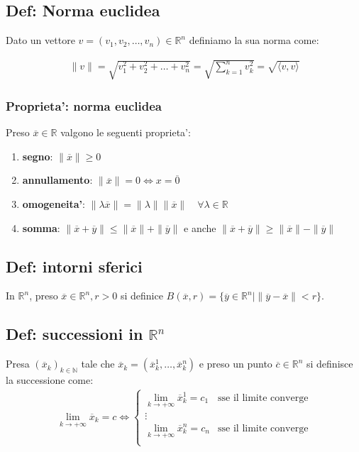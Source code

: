 \documentclass{article}
\begin{document}
\subsection{Def: Norma euclidea}

Dato un vettore $v = (v_1, v_2, \ldots, v_n) \in \mathbb{R}^n$ definiamo la sua 
norma come:

\begin{align*}
  \| v \| = \sqrt{v_1^2 + v_2^2 + \ldots + v_n^2} = \sqrt{\sum_{k=1}^n v_k^2} = \sqrt{\langle v, v \rangle}
\end{align*}

\subsubsection{Proprieta': norma euclidea}

Preso $\overline{x} \in \mathbb{R}$ valgono le seguenti proprieta':
\begin{enumerate}
  \item \textbf{segno}: $\| \overline{x} \| \geq 0$
  \item \textbf{annullamento}: $\| \overline{x} \| = 0 \iff x = \overline{0}$
  \item \textbf{omogeneita'}: $\| \lambda \overline{x} \| = \| \lambda \| \| 
    \overline{x} \| \quad \forall \lambda \in \mathbb{R}$
  \item \textbf{somma}: $\| \overline{x} + \overline{y} \| \leq \| \overline{x} \|
    + \| \overline{y} \|$ e anche $\| \overline{x} + \overline{y} \| \geq \|
    \overline{x} \| - \| \overline{y} \|$
\end{enumerate}

\subsection{Def: intorni sferici}

In $\mathbb{R}^n$, preso $\overline{x} \in \mathbb{R}^n, r > 0$ si definice
$B(\overline{x}, r) = \{ \overline{y} \in \mathbb{R}^n \mid \| \overline{y}
- \overline{x} \| < r \}$.

\subsection{Def: successioni in $\mathbb{R}^n$}

Presa $(\overline{x}_k)_{k \in \mathbb{N}}$ tale che $\overline{x}_k =
(\overline{x}_k^1, \ldots, \overline{x}_k^n)$ e preso un punto $\overline{c} \in \mathbb{R}^n$
si definisce la successione come:
\begin{align*}
  \lim_{k \to +\infty} \overline{x}_k = c \iff \begin{cases}
    \lim_{k \to +\infty} \overline{x}_k^1 = c_1 &\text{sse il limite converge} \\
    \vdots \\
    \lim_{k \to +\infty} \overline{x}_k^n = c_n &\text{sse il limite converge} \\
  \end{cases}
\end{align*}
\end{document}
